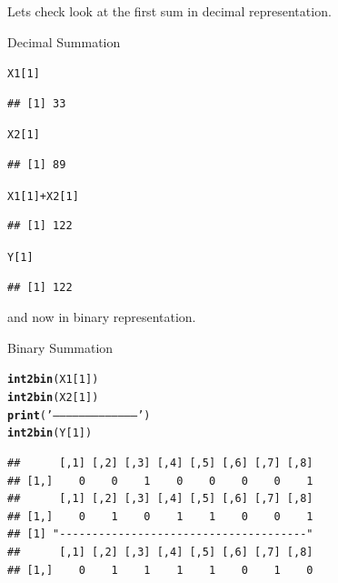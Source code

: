 \documentclass[british]{article}\usepackage[]{graphicx}\usepackage[]{color}
\makeatletter
\newcommand{\hlnum}[1]{\textcolor[rgb]{0.686,0.059,0.569}{#1}}%
\newcommand{\hlstr}[1]{\textcolor[rgb]{0.192,0.494,0.8}{#1}}%
\newcommand{\hlopt}[1]{\textcolor[rgb]{0,0,0}{#1}}%
\newcommand{\hlstd}[1]{\textcolor[rgb]{0.345,0.345,0.345}{#1}}%
\newcommand{\hlkwd}[1]{\textcolor[rgb]{0.737,0.353,0.396}{\textbf{#1}}}%
\newenvironment{kframe}{%
 \def\at@end@of@kframe{}%
 \ifinner\ifhmode%
  \def\at@end@of@kframe{\end{minipage}}%
  \begin{minipage}{\columnwidth}%
 \fi\fi%
 \def\FrameCommand##1{\hskip\@totalleftmargin \hskip-\fboxsep
 \colorbox{shadecolor}{##1}\hskip-\fboxsep
     \hskip-\linewidth \hskip-\@totalleftmargin \hskip\columnwidth}%
 \MakeFramed {\advance\hsize-\width
   \@totalleftmargin\z@ \linewidth\hsize
   \@setminipage}}%
 {\par\unskip\endMakeFramed%
 \at@end@of@kframe}
\newenvironment{knitrout}{}{} %
\makeatother
\begin{document}
Lets check look at the first sum in decimal representation.

\begin{table}[H]


\caption{Decimal Summation}


\begin{knitrout}
\color{fgcolor}\begin{kframe}
\begin{alltt}
\hlstd{X1[}\hlnum{1}\hlstd{]}
\end{alltt}
\begin{verbatim}
## [1] 33
\end{verbatim}
\begin{alltt}
\hlstd{X2[}\hlnum{1}\hlstd{]}
\end{alltt}
\begin{verbatim}
## [1] 89
\end{verbatim}
\begin{alltt}
\hlstd{X1[}\hlnum{1}\hlstd{]} \hlopt{+} \hlstd{X2[}\hlnum{1}\hlstd{]}
\end{alltt}
\begin{verbatim}
## [1] 122
\end{verbatim}
\begin{alltt}
\hlstd{Y[}\hlnum{1}\hlstd{]}
\end{alltt}
\begin{verbatim}
## [1] 122
\end{verbatim}
\end{kframe}
\end{knitrout}

\end{table}


and now in binary representation.

\begin{table}[H]


\caption{Binary Summation}


\begin{knitrout}
\color{fgcolor}\begin{kframe}
\begin{alltt}
\hlkwd{int2bin}\hlstd{( X1[}\hlnum{1}\hlstd{] )}
\hlkwd{int2bin}\hlstd{( X2[}\hlnum{1}\hlstd{] )}
\hlkwd{print}\hlstd{(}\hlstr{'--------------------------------------'}\hlstd{)}
\hlkwd{int2bin}\hlstd{( Y[}\hlnum{1}\hlstd{]  )}
\end{alltt}
\begin{verbatim}
##      [,1] [,2] [,3] [,4] [,5] [,6] [,7] [,8]
## [1,]    0    0    1    0    0    0    0    1
##      [,1] [,2] [,3] [,4] [,5] [,6] [,7] [,8]
## [1,]    0    1    0    1    1    0    0    1
## [1] "--------------------------------------"
##      [,1] [,2] [,3] [,4] [,5] [,6] [,7] [,8]
## [1,]    0    1    1    1    1    0    1    0
\end{verbatim}
\end{kframe}
\end{knitrout}

\end{table}
\end{document}
